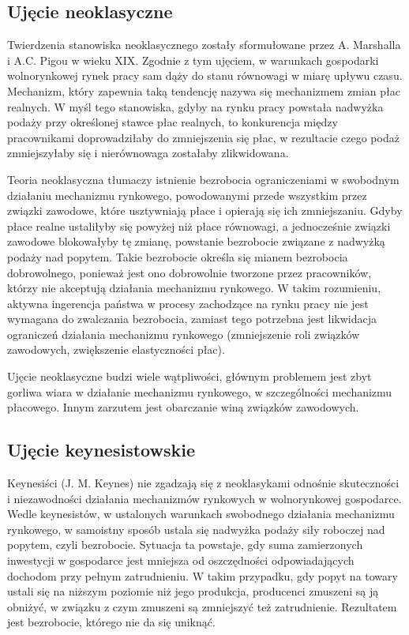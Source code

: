 \documentclass[12pt]{extarticle}
\begin{document}
\subsection{Ujęcie neoklasyczne}

Twierdzenia stanowiska neoklasycznego zostały sformułowane przez A. Marshalla i A.C. Pigou w wieku XIX. Zgodnie z tym ujęciem, w warunkach gospodarki wolnorynkowej rynek pracy sam dąży do stanu równowagi w miarę upływu czasu. Mechanizm, który zapewnia taką tendencję nazywa się mechanizmem zmian płac realnych. W myśl tego stanowiska, gdyby na rynku pracy powstała nadwyżka podaży przy określonej stawce płac realnych, to konkurencja między pracownikami doprowadziłaby do zmniejszenia się płac, w rezultacie czego podaż zmniejszyłaby się i nierównowaga zostałaby zlikwidowana.

Teoria neoklasyczna tłumaczy istnienie bezrobocia ograniczeniami w swobodnym działaniu mechanizmu rynkowego, powodowanymi przede wszystkim przez związki zawodowe, które usztywniają płace i opierają się ich zmniejszaniu. Gdyby płace realne ustaliłyby się powyżej niż płace równowagi, a jednocześnie związki zawodowe blokowałyby tę zmianę, powstanie bezrobocie związane z nadwyżką podaży nad popytem. Takie bezrobocie określa się mianem bezrobocia dobrowolnego, ponieważ jest ono dobrowolnie tworzone przez pracowników, którzy nie akceptują działania mechanizmu rynkowego. W takim rozumieniu, aktywna ingerencja państwa w procesy zachodzące na rynku pracy nie jest wymagana do zwalczania bezrobocia, zamiast tego potrzebna jest likwidacja ograniczeń działania mechanizmu rynkowego (zmniejszenie roli związków zawodowych, zwiększenie elastyczności płac).

Ujęcie neoklasyczne budzi wiele wątpliwości, głównym problemem jest zbyt gorliwa wiara w działanie mechanizmu rynkowego, w szczególności mechanizmu płacowego. Innym zarzutem jest obarczanie winą związków zawodowych.


\subsection{Ujęcie keynesistowskie}

Keynesiści (J. M. Keynes) nie zgadzają się z neoklasykami odnośnie skuteczności i niezawodności działania mechanizmów rynkowych w wolnorynkowej gospodarce. Wedle keynesistów, w ustalonych warunkach swobodnego działania mechanizmu rynkowego, w samoistny sposób ustala się nadwyżka podaży siły roboczej nad popytem, czyli bezrobocie. Sytuacja ta powstaje, gdy suma zamierzonych inwestycji w gospodarce jest mniejsza od oszczędności odpowiadających dochodom przy pełnym zatrudnieniu. W takim przypadku, gdy popyt na towary ustali się na niższym poziomie niż jego produkcja, producenci zmuszeni są ją obniżyć, w związku z czym zmuszeni są zmniejszyć też zatrudnienie. Rezultatem jest bezrobocie, którego nie da się uniknąć.
\end{document}
